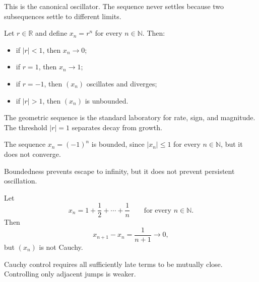 \begin{remark*}[Interpretation]
This is the canonical oscillator. The sequence never settles because two
subsequences settle to different limits.
\end{remark*}

\begin{example*}
\label{ex:sequence-example-geometric}
Let $r\in\mathbb{R}$ and define $x_n=r^n$ for every $n\in\mathbb{N}$.
Then:
\begin{itemize}
  \item if $|r|<1$, then $x_n\to 0$;
  \item if $r=1$, then $x_n\to 1$;
  \item if $r=-1$, then $(x_n)$ oscillates and diverges;
  \item if $|r|>1$, then $(x_n)$ is unbounded.
\end{itemize}
\end{example*}

\begin{remark*}[Interpretation]
The geometric sequence is the standard laboratory for rate, sign, and
magnitude. The threshold $|r|=1$ separates decay from growth.
\end{remark*}

\begin{example*}
\label{ex:sequence-counterexample-bounded-not-convergent}
The sequence $x_n=(-1)^n$ is bounded, since $|x_n|\le 1$ for every
$n\in\mathbb{N}$, but it does not converge.
\end{example*}

\begin{remark*}[Interpretation]
Boundedness prevents escape to infinity, but it does not prevent persistent
oscillation.
\end{remark*}

\begin{example*}
\label{ex:sequence-counterexample-successive-differences-not-cauchy}
Let
\[
  x_n=1+\frac{1}{2}+\cdots+\frac{1}{n}
  \qquad
  \text{for every } n\in\mathbb{N}.
\]
Then
\[
  x_{n+1}-x_n=\frac{1}{n+1}\to 0,
\]
but $(x_n)$ is not Cauchy.
\end{example*}

\begin{remark*}[Interpretation]
Cauchy control requires all sufficiently late terms to be mutually close.
Controlling only adjacent jumps is weaker.
\end{remark*}